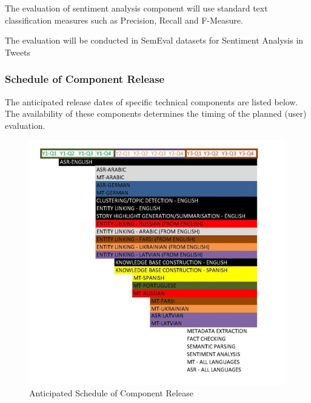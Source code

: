 The evaluation of sentiment analysis component will use standard text classification measures such as Precision, Recall and F-Measure. 

The evaluation will be conducted in SemEval datasets for Sentiment Analysis in Tweets \citep{Nakov13SemEval, Rosenthal14SemEval, Rosenthal15SemEval, Nakov16SemEval}


\subsubsection{Schedule of Component Release}

The anticipated release dates of specific technical components are listed below. The availability of these components determines the timing of the planned (user) evaluation.




\begin{figure}[ht]
    \centering
    \includegraphics[width=1.0\textwidth]{./images/evaluation_timing_v5.png}
    \caption{Anticipated Schedule of Component Release}
    \label{fig:Evaluation Planning Time Schedule}
\end{figure}







